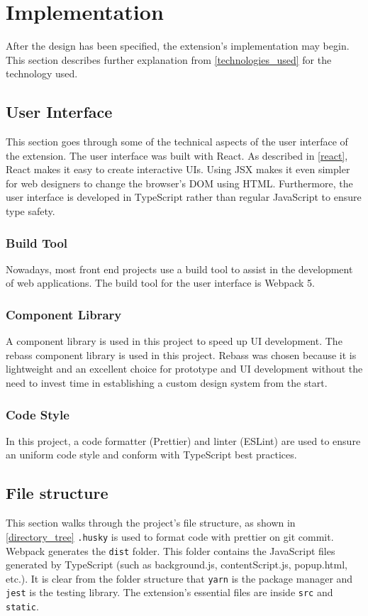 \newpage
\chapter{Implementation}
After the design has been specified, the extension's implementation may begin. This section describes further explanation from \autoref{technologies_used} for the technology used.

\section{User Interface}
This section goes through some of the technical aspects of the user interface of the extension. The user interface was built with React. As described in \autoref{react}, React makes it easy to create interactive UIs. Using JSX makes it even simpler for web designers to change the browser's DOM using HTML. Furthermore, the user interface is developed in TypeScript rather than regular JavaScript to ensure type safety.

\subsection{Build Tool}
Nowadays, most front end projects use a build tool to assist in the development of web applications. The build tool for the user interface is Webpack 5.

\subsection{Component Library}
A component library is used in this project to speed up UI development. The rebass component library is used in this project. Rebass was chosen because it is lightweight and an excellent choice for prototype and UI development without the need to invest time in establishing a custom design system from the start.

\subsection{Code Style}
In this project, a code formatter (Prettier) and linter (ESLint) are used to ensure an uniform code style and conform with TypeScript best practices.

\section{File structure}
This section walks through the project's file structure, as shown in \autoref{directory_tree} \verb;.husky; is used to format code with prettier on git commit. Webpack generates the \verb;dist; folder. This folder contains the JavaScript files generated by TypeScript (such as background.js, contentScript.js, popup.html, etc.). It is clear from the folder structure that \verb;yarn; is the package manager and \verb;jest; is the testing library. The extension's essential files are inside \verb;src; and \verb;static;.

